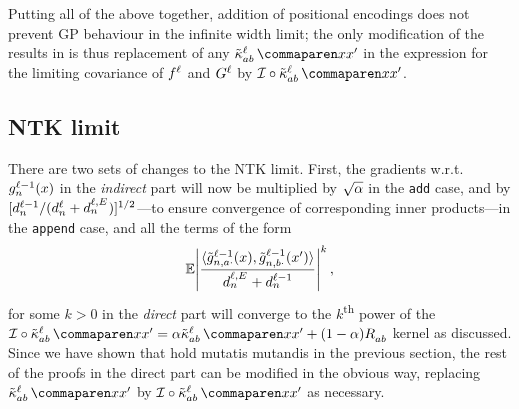 Putting all of the above together, addition of positional encodings does not prevent GP behaviour in the infinite width limit;
the only modification of the results in  is thus replacement of any $\kerntildef{a b}{\depthSymbol}{\inputSymbol}{\inputSymbol'}$ in the expression for the limiting covariance of $f^{\ell}$ and $G^{\ell}$ by $\interpKern\circ\kerntildef{a b}{\depthSymbol}{\inputSymbol}{\inputSymbol'}$.
%



\subsection{NTK limit}

There are two sets of changes to the NTK limit.
First, the gradients w.r.t.\ ${g}^{\ell - 1}_{n}{(x)}$ in the \emph{indirect} part will now be multiplied by $\sqrt{\alpha}$ in the \texttt{add} case, and by $[d_{n}^{\ell - 1} / (d_{n}^{\ell} + d_{n}^{\ell, E_{}^{}})]^{1/2}$---to ensure convergence of corresponding inner products---in the \texttt{append} case, and all the terms of the form 
$$
    \operatorname*{\mathbb{E}} \Biggl|
        \frac{
            \langle {\tilde{g}}^{\ell - 1}_{n, a \cdot}{(x)} , {\tilde{g}}^{\ell - 1}_{n, b \cdot}{(x')} \rangle
        }{
            d_{n}^{\ell, E_{}^{}} + d_{n}^{\ell - 1}
        }
    \Biggr|^k
    \, ,
$$
for some $k > 0$ in the \emph{direct} part will converge to the $k$\textsuperscript{th} power of the $\interpKern\circ\kerntildef{a b}{\depthSymbol}{\inputSymbol}{\inputSymbol'} = \alpha \kerntildef{a b }{\depthSymbol}{\inputSymbol}{\inputSymbol'} + (1 - \alpha) \covPosEmb{a b}{}$ kernel as discussed.
Since we have shown that  hold mutatis mutandis in the previous section, the rest of the proofs in the direct part can be modified in the obvious way, replacing $\kerntildef{a b}{\depthSymbol}{\inputSymbol}{\inputSymbol'}$ by $\interpKern\circ\kerntildef{a b}{\depthSymbol}{\inputSymbol}{\inputSymbol'}$ as necessary.

